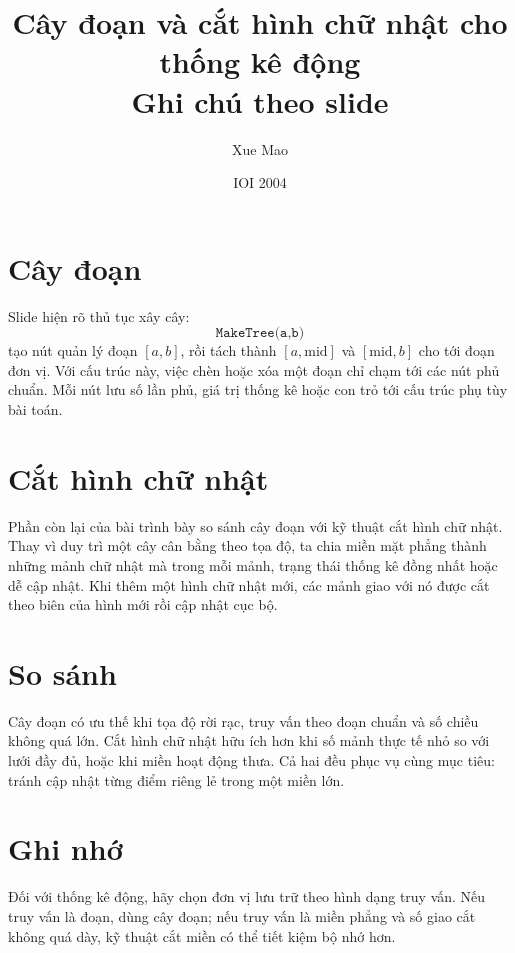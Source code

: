 \documentclass[11pt]{article}
\title{Cây đoạn và cắt hình chữ nhật cho thống kê động\\{\large Ghi chú theo slide}}
\author{Xue Mao}
\date{IOI 2004}
\begin{document}
\maketitle


\section{Cây đoạn}

Slide hiện rõ thủ tục xây cây:
\[
  \texttt{MakeTree(a,b)}
\]
tạo nút quản lý đoạn \([a,b]\), rồi tách thành \([a,\mathrm{mid}]\) và
\([\mathrm{mid},b]\) cho tới đoạn đơn vị. Với cấu trúc này, việc chèn hoặc
xóa một đoạn chỉ chạm tới các nút phủ chuẩn. Mỗi nút lưu số lần phủ, giá trị
thống kê hoặc con trỏ tới cấu trúc phụ tùy bài toán.

\section{Cắt hình chữ nhật}

Phần còn lại của bài trình bày so sánh cây đoạn với kỹ thuật cắt hình chữ
nhật. Thay vì duy trì một cây cân bằng theo tọa độ, ta chia miền mặt phẳng
thành những mảnh chữ nhật mà trong mỗi mảnh, trạng thái thống kê đồng nhất
hoặc dễ cập nhật. Khi thêm một hình chữ nhật mới, các mảnh giao với nó được
cắt theo biên của hình mới rồi cập nhật cục bộ.

\section{So sánh}

Cây đoạn có ưu thế khi tọa độ rời rạc, truy vấn theo đoạn chuẩn và số chiều
không quá lớn. Cắt hình chữ nhật hữu ích hơn khi số mảnh thực tế nhỏ so với
lưới đầy đủ, hoặc khi miền hoạt động thưa. Cả hai đều phục vụ cùng mục tiêu:
tránh cập nhật từng điểm riêng lẻ trong một miền lớn.

\section{Ghi nhớ}

Đối với thống kê động, hãy chọn đơn vị lưu trữ theo hình dạng truy vấn. Nếu
truy vấn là đoạn, dùng cây đoạn; nếu truy vấn là miền phẳng và số giao cắt
không quá dày, kỹ thuật cắt miền có thể tiết kiệm bộ nhớ hơn.
\end{document}
